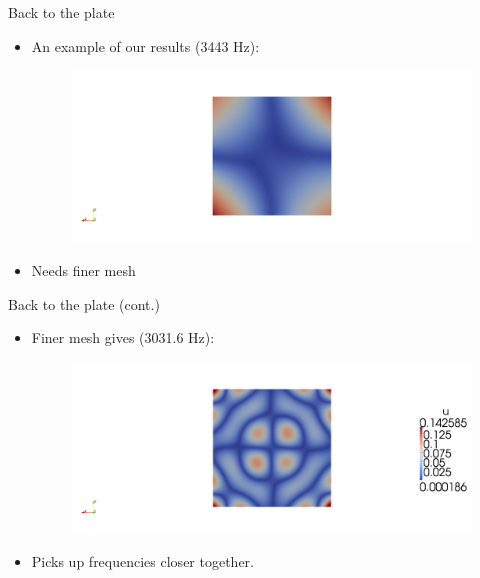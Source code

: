 \documentclass{beamer}[10pt]
\begin{document}
\begin{frame}{Back to the plate}
\begin{itemize}
\item { An example of our results (3443 Hz):
\begin{figure}
\centering
\includegraphics[scale=0.3, trim= 100mm 0mm 100mm 0mm, clip]{1small.png}
\end{figure}}
\item{Needs finer mesh}
\end{itemize}

\end{frame}

\begin{frame}{Back to the plate (cont.)}
\begin{itemize}
\item {
Finer mesh gives (3031.6 Hz):
\begin{figure}
\centering
\includegraphics[scale=0.3, trim= 100mm 0mm 100mm 0mm, clip]{18.png}
\end{figure}
}
\item {Picks up frequencies closer together.}
\end{itemize}

\end{frame}
\end{document}
